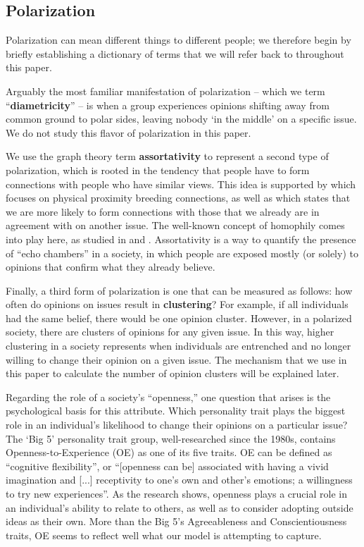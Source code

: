 \subsection{Polarization}

Polarization can mean different things to different people; we therefore begin
by briefly establishing a dictionary of terms that we will refer back to
throughout this paper.

Arguably the most familiar manifestation of polarization -- which we term
``\textbf{diametricity}'' -- is when a group experiences opinions shifting away
from common ground to polar sides, leaving nobody `in the middle' on a specific
issue. We do not study this flavor of polarization in this paper.

We use the graph theory term \textbf{assortativity} to represent a second type
of polarization, which is rooted in the tendency that people have to form
connections with people who have similar views. This idea is supported by
\cite{klinkner_red_2005} which focuses on physical proximity breeding
connections, as well as \cite{cholvy_diffusion_2016} which states that we are
more likely to form connections with those that we already are in agreement
with on another issue. The well-known concept of homophily comes into play
here, as studied in \cite{davies_twin_2017} and \cite{taylor_exploring_2018}.
Assortativity is a way to quantify the presence of ``echo chambers'' in a
society, in which people are exposed mostly (or solely) to opinions that
confirm what they already
believe.\cite{dandekar_biased_2013,flaxman_filter_2016}

Finally, a third form of polarization is one that can be measured as follows:
how often do opinions on issues result in \textbf{clustering}? For
example, if all individuals had the same belief, there would be one opinion
cluster. However, in a polarized society, there are clusters of opinions for any given issue. In this way, higher clustering in a society represents when individuals are entrenched and no longer willing to change their opinion on a given issue. The mechanism that we use in this paper to calculate the number of opinion clusters will be explained later.

Regarding the role of a society's ``openness,'' one question that arises is the
psychological basis for this attribute. Which personality trait plays the
biggest role in an individual's likelihood to change their opinions on a
particular issue? The `Big 5' personality trait group\cite{john_big-five_1999},
well-researched since the 1980s, contains Openness-to-Experience (OE) as one of
its five traits. OE can be defined as ``cognitive
flexibility''\cite{deyoung_sources_2005}, or ``[openness can be] associated
with having a vivid imagination and [...] receptivity to one's own and other's
emotions; a willingness to try new experiences''\cite{furnham_childhood_2016}.
As the research shows, openness plays a crucial role in an individual's ability
to relate to others, as well as to consider adopting outside ideas as their
own. More than the Big 5's Agreeableness and Conscientiousness traits, OE seems
to reflect well what our model is attempting to capture.
